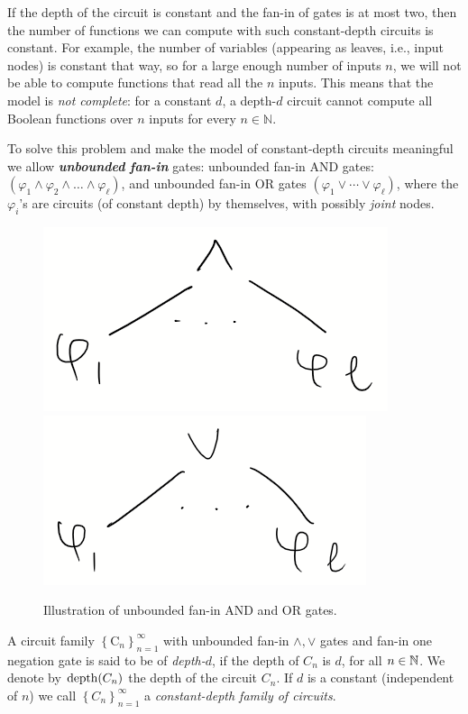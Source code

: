 

\begin{note}
If the depth of the circuit is constant and the fan-in of gates is at most two, then the number of functions we can compute with such constant-depth circuits is constant. For example, the number of variables (appearing as leaves, i.e., input nodes) is constant that way, so for a large enough number of inputs $n$, we will not be able to compute functions that read all the $n$ inputs. This means that the model is \emph{not  complete}: for a constant $d$, a depth-$d$ circuit cannot compute all Boolean functions over $n$ inputs for every $n \in \mathbb{N}$.
\end{note}

To solve this problem and make the model of constant-depth
circuits meaningful we allow \textbf{\textit{unbounded} \emph{fan-in}} gates: unbounded fan-in AND gates: $\left(\varphi_1 \wedge \varphi_2 \wedge \ldots \wedge \varphi_\ell\right)$, and unbounded fan-in OR gates
$\left(\varphi_1\lor \cdots \lor \varphi_{\ell}\right)$, where the $\varphi_i$'s are circuits (of constant depth) by themselves, with possibly \emph{joint} nodes. 
\begin{figure}
    \centering
    \includegraphics[width=0.2\linewidth]{images/AND.png}
    \includegraphics[width=0.25\linewidth]{images/OR.png}
    \caption{Illustration of unbounded fan-in AND and OR gates.}
\end{figure}



\newcommand{\depth}{\ensuremath{{\rm depth}}}

\begin{definition}
\label{def:constant-depth-circuit}
A circuit family 
$\left\{\mathrm{C}_n\right\}_{n=1}^\infty$ with unbounded fan-in $\land,\lor$ gates and fan-in one negation gate is said to be of \emph{depth-$d$}, if the depth of $C_{n}$ is $d$, for all $n\in\mathbb{N}$. We denote by $\depth(C_n)$ the depth of the circuit $C_n$.
If $d$ is a constant (independent of $n$) we call $\left\{C_n\right\}_{n=1}^\infty$ a \emph{constant-depth family of circuits}.
\end{definition}

